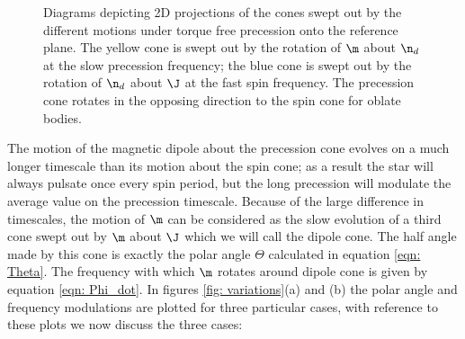 \documentclass[/home/greg/Thesis/main/main.tex]{subfiles}
\begin{document}
\begin{figure}[ht]
\centering
\caption{Diagrams depicting 2D projections of the cones swept out by the
    different motions under torque free precession onto the reference plane.
    The yellow cone is swept out by the rotation of $\m$ about $\n_{d}$ at the
    slow precession frequency; the blue cone is swept out by the rotation of
    $\n_{d}$ about $\J$ at the fast spin frequency. The
precession cone rotates in the opposing direction to the spin cone for oblate
bodies.}
\label{fig: cones}
\end{figure}

The motion of the magnetic dipole about the precession cone evolves on a much
longer timescale than its motion about the spin cone; as a result the star will
always pulsate once every spin period, but the long precession will modulate
the average value on the precession timescale. Because of the large difference
in timescales, the motion of $\m$ can be considered as the slow evolution of a
third cone swept out by $\m$ about $\J$ which we will call the dipole cone. The
half angle made by this cone is exactly the polar angle $\Theta$ calculated
in equation \eqref{eqn: Theta}. The frequency with which $\m$ rotates around
dipole cone is given by equation \eqref{eqn: Phi_dot}. In figures \ref{fig:
variations}(a) and (b) the polar angle and frequency modulations are plotted for
three particular cases, with reference to these plots we now discuss the three
cases:
\end{document}
